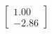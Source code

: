 \documentclass[preview]{standalone}
\begin{document}
\begin{align*}
\begin{bmatrix} 1.00 \\ -2.86 \end{bmatrix}
\end{align*}
\end{document}
